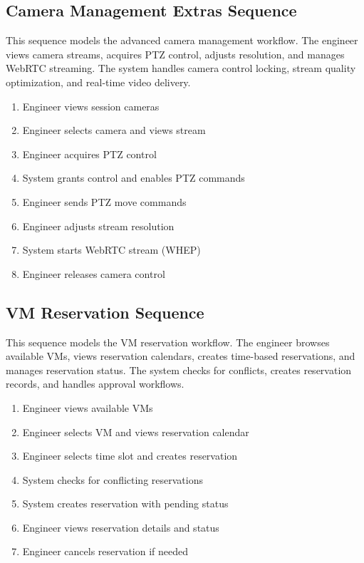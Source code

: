 \subsection{Camera Management Extras Sequence}
This sequence models the advanced camera management workflow. The engineer
views camera streams, acquires PTZ control, adjusts resolution, and manages
WebRTC streaming. The system handles camera control locking, stream quality
optimization, and real-time video delivery.

\begin{enumerate}[topsep=0pt,itemsep=1pt,parsep=0pt,partopsep=0pt]
    \item Engineer views session cameras
    \item Engineer selects camera and views stream
    \item Engineer acquires PTZ control
    \item System grants control and enables PTZ commands
    \item Engineer sends PTZ move commands
    \item Engineer adjusts stream resolution
    \item System starts WebRTC stream (WHEP)
    \item Engineer releases camera control
\end{enumerate}


\subsection{VM Reservation Sequence}
This sequence models the VM reservation workflow. The engineer browses
available VMs, views reservation calendars, creates time-based reservations,
and manages reservation status. The system checks for conflicts, creates
reservation records, and handles approval workflows.

\begin{enumerate}[topsep=0pt,itemsep=1pt,parsep=0pt,partopsep=0pt]
    \item Engineer views available VMs
    \item Engineer selects VM and views reservation calendar
    \item Engineer selects time slot and creates reservation
    \item System checks for conflicting reservations
    \item System creates reservation with pending status
    \item Engineer views reservation details and status
    \item Engineer cancels reservation if needed
\end{enumerate}

